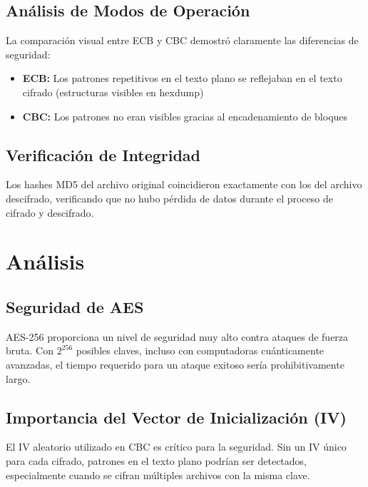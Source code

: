 \documentclass[11pt,a4paper]{article}
\begin{document}
\subsection{Análisis de Modos de Operación}

La comparación visual entre ECB y CBC demostró claramente las diferencias de seguridad:

\begin{itemize}
    \item \textbf{ECB:} Los patrones repetitivos en el texto plano se reflejaban en el texto cifrado (estructuras visibles en hexdump)
    \item \textbf{CBC:} Los patrones no eran visibles gracias al encadenamiento de bloques
\end{itemize}

\subsection{Verificación de Integridad}

Los hashes MD5 del archivo original coincidieron exactamente con los del archivo descifrado, verificando que no hubo pérdida de datos durante el proceso de cifrado y descifrado.

\section{Análisis}

\subsection{Seguridad de AES}

AES-256 proporciona un nivel de seguridad muy alto contra ataques de fuerza bruta. Con $2^{256}$ posibles claves, incluso con computadoras cuánticamente avanzadas, el tiempo requerido para un ataque exitoso sería prohibitivamente largo.

\subsection{Importancia del Vector de Inicialización (IV)}

El IV aleatorio utilizado en CBC es crítico para la seguridad. Sin un IV único para cada cifrado, patrones en el texto plano podrían ser detectados, especialmente cuando se cifran múltiples archivos con la misma clave.
\end{document}
